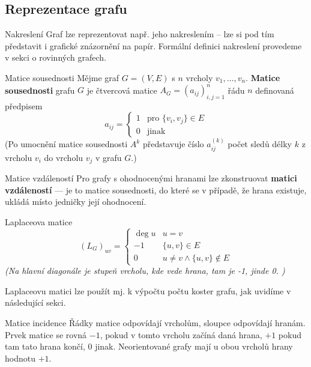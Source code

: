 \subsection{Reprezentace grafu}

\begin{definiceN}{Nakreslení}
Graf lze reprezentovat např. jeho nakreslením -- lze si pod tím představit i grafické znázornění na papír. Formální definici nakreslení provedeme v sekci o rovinných grafech.
\end{definiceN}

\begin{definiceN}{Matice sousednosti}
Mějme graf $G=(V,E)$ s $n$ vrcholy $v_1,\dots,v_n.$ \textbf{Matice sousednosti} grafu $G$ je čtvercová matice $A_G=(a_{ij})^n_{i,j=1}$ řádu $n$ definovaná předpisem
$$
a_{ij} =
\begin{cases}
1 & \text{pro $\{v_i,v_j\} \in E$}\\
0 & \text{jinak}
\end{cases}
$$
(Po umocnění matice sousednosti $A^k$ představuje číslo $a_{ij}^{(k)}$ počet sledů délky $k$ z vrcholu $v_i$ do vrcholu $v_j$ v grafu $G.$)
\end{definiceN}

\begin{definiceN}{Matice vzdáleností}
Pro grafy s ohodnocenými hranami lze zkonstruovat \textbf{matici vzdáleností} --- je to matice sousednosti, do které se v případě, že hrana existuje, ukládá místo jedničky její ohodnocení.
\end{definiceN}

\begin{definiceN}{Laplaceova matice}
$$
(L_G)_{uv} =
\begin{cases}
\deg u & u=v\\
-1 & \{u,v\} \in E\\
0 & u \not= v \land \{u,v\} \not \in E
\end{cases}
$$
\textit{(Na hlavní diagonále je stupeň vrcholu, kde vede hrana, tam je -1, jinde 0. %
)}

\begin{poznamka}
Laplaceovu matici lze použít mj. k výpočtu počtu koster grafu, jak uvidíme v následující sekci.
\end{poznamka}
\end{definiceN}

\begin{definiceN}{Matice incidence}
Řádky matice odpovídají vrcholům, sloupce odpovídají hranám. Prvek matice se rovná $-1$, pokud v tomto vrcholu začíná daná hrana, $+1$ pokud tam tato hrana končí, $0$ jinak. Neorientované grafy mají u obou vrcholů hrany hodnotu $+1$.
\end{definiceN}

